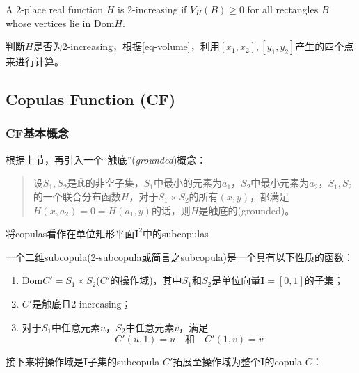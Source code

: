\begin{definition}
    A 2-place real function $H$ is 2-increasing if $V_H(B) \geq 0$ for all rectangles $B$ whose vertices lie in Dom$H$.
    \label{def2.1.2}
\end{definition}

判断$H$是否为2-increasing，根据\cref{eq-volume}，利用$[x_1,x_2],[y_1,y_2]$产生的四个点来进行计算。


\subsection{Copulas Function (CF)}
\subsubsection{CF基本概念}
根据上节，再引入一个``触底''(\emph{\textcolor[rgb]{1,0,0}{grounded}})概念：
\begin{quotation}
    设$S_1,S_2$是$\bar{\mathbf{R}}$的非空子集，$S_1$中最小的元素为$a_1$，$S_2$中最小元素为$a_2$，$S_1,S_2$的一个联合分布函数$H$，对于$S_1 \times S_2$的所有$(x,y)$，都满足$H(x,a_2)=0=H(a_1,y)$的话，则$H$是触底的(grounded)。
\end{quotation}

将copulas看作在单位矩形平面$\mathbf{I}^2$中的subcopulas
\begin{definition}
    一个二维subcopula(2-subcopula或简言之subcopula)是一个具有以下性质的函数：
    \begin{enumerate}[1.]
        \item Dom$C' = S_1 \times S_2$($C'$的操作域)，其中$S_1$和$S_2$是单位向量$\mathbf{I}=[0,1]$的子集；
        \item $C'$是触底且2-increasing；
        \item 对于$S_1$中任意元素$u$，$S_2$中任意元素$v$，满足
            \begin{equation}
                C'(u,1) = u \quad \text{和} \quad C'(1,v) = v
                \label{eq-subcopula}
            \end{equation}
    \end{enumerate}
    \label{def2.2.1}
\end{definition}


接下来将操作域是$\mathbf{I}$子集的subcopula $C'$拓展至操作域为整个$\mathbf{I}$的copula $C$：


